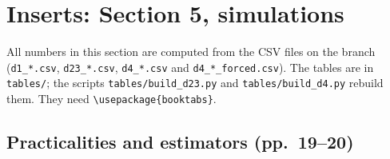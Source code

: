 \documentclass[11pt]{article}
\theoremstyle{plain}
\theoremstyle{remark}
\begin{document}
\section{Inserts: Section 5, simulations}\label{sec:sims}

All numbers in this section are computed from the CSV files on the branch
(\texttt{d1\_*.csv}, \texttt{d23\_*.csv}, \texttt{d4\_*.csv} and
\texttt{d4\_*\_forced.csv}). The tables are in \texttt{tables/}; the scripts
\texttt{tables/build\_d23.py} and \texttt{tables/build\_d4.py} rebuild them. They
need \verb|\usepackage{booktabs}|.

\subsection{Practicalities and estimators (pp.~19--20)}
\end{document}
